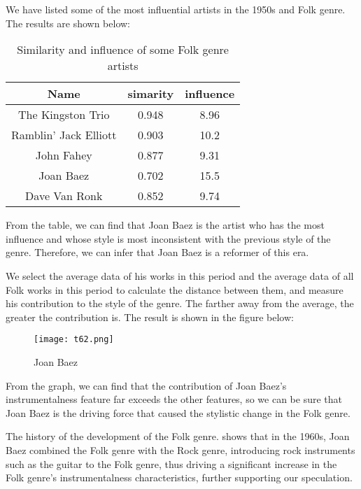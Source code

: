 \documentclass[12pt]{article}  %
\newcommand{\upcite}[1]{\textsuperscript{\textsuperscript{\cite{#1}}}}
\begin{document}
We have listed some of the most influential artists in the 1950s and Folk genre. The results are shown below:

\begin{table}[H]
    \centering 
    \begin{tabular}{ccc}
    \hline
    \hline
    \multicolumn{1}{c|}{Name}                       & \multicolumn{1}{l}{simarity} & influence \\ \hline
    \multicolumn{1}{c|}{The Kingston Trio}     & 0.948                        & 8.96      \\
    \multicolumn{1}{c|}{Ramblin' Jack Elliott} & 0.903                        & 10.2      \\
    \multicolumn{1}{c|}{John Fahey}            & 0.877                        & 9.31      \\
    \multicolumn{1}{c|}{Joan Baez}             & 0.702                        & 15.5      \\
    \multicolumn{1}{c|}{Dave Van Ronk}         & 0.852                        & 9.74      \\ \hline
    \hline
    \end{tabular}
	\caption{Similarity and influence of some Folk genre artists}
\end{table}

From the table, we can find that Joan Baez is the artist who has the most influence and whose style is most inconsistent with the previous style of the genre. Therefore, we can infer that Joan Baez is a reformer of this era.

We select the average data of his works in this period and the average data of all Folk works in this period to calculate the distance between them, and measure his contribution to the style of the genre. The farther away from the average, the greater the contribution is. The result is shown in the figure below:

\begin{figure}[H]
    \centering
    \texttt{[image: t62.png]}
    \caption{Joan Baez}
    \label{img}
\end{figure}

From the graph, we can find that the contribution of Joan Baez's instrumentalness feature far exceeds the other features, so we can be sure that Joan Baez is the driving force that caused the stylistic change in the Folk genre.


The history of the development of the Folk genre\upcite{2}.
 shows that in the 1960s, Joan Baez combined the Folk genre with the Rock genre, introducing rock instruments such as the guitar to the Folk genre, thus driving a significant increase in the Folk genre's instrumentalness characteristics, further supporting our speculation.
\end{document}

